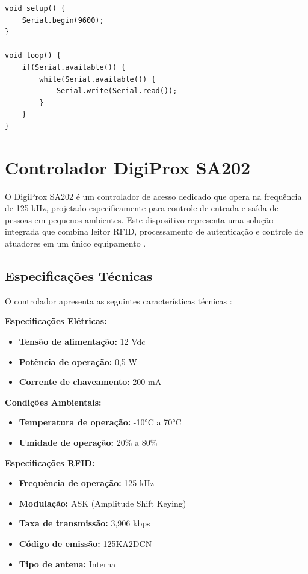 \begin{verbatim}
void setup() {
    Serial.begin(9600);
}

void loop() {
    if(Serial.available()) {
        while(Serial.available()) {
            Serial.write(Serial.read());
        }
    }
}
\end{verbatim}

\section{Controlador DigiProx SA202}
\label{sec:digiprox-sa202}

O DigiProx SA202 é um controlador de acesso dedicado que opera na frequência de 125 kHz, projetado especificamente para controle de entrada e saída de pessoas em pequenos ambientes. Este dispositivo representa uma solução integrada que combina leitor RFID, processamento de autenticação e controle de atuadores em um único equipamento \cite{intelbras-digiprox-sa202}.

\subsection{Especificações Técnicas}

O controlador apresenta as seguintes características técnicas \cite{intelbras-digiprox-sa202}:

\textbf{Especificações Elétricas:}
\begin{itemize}
\item \textbf{Tensão de alimentação:} 12 Vdc
\item \textbf{Potência de operação:} 0,5 W
\item \textbf{Corrente de chaveamento:} 200 mA
\end{itemize}



\textbf{Condições Ambientais:}
\begin{itemize}
\item \textbf{Temperatura de operação:} -10°C a 70°C
\item \textbf{Umidade de operação:} 20\% a 80\%
\end{itemize}

\textbf{Especificações RFID:}
\begin{itemize}
\item \textbf{Frequência de operação:} 125 kHz
\item \textbf{Modulação:} ASK (Amplitude Shift Keying)
\item \textbf{Taxa de transmissão:} 3,906 kbps
\item \textbf{Código de emissão:} 125KA2DCN
\item \textbf{Tipo de antena:} Interna
\end{itemize}

